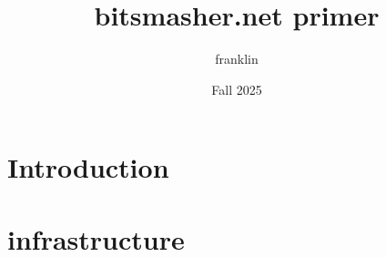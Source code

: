 \documentclass[a4paper,12pt]{book}
\begin{document}
\author{franklin}
\title{bitsmasher.net primer}
\date{Fall 2025}

\frontmatter
\maketitle
\tableofcontents

\mainmatter

\section {Introduction}



\section{infrastructure}




\backmatter
\end{document}
